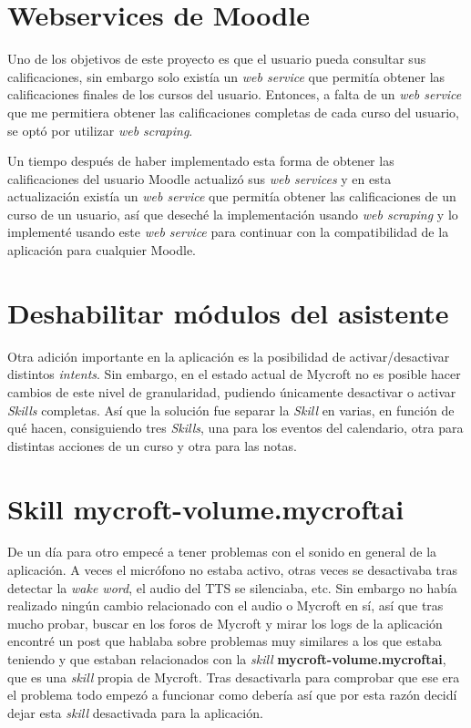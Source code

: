 \section{Webservices de Moodle}

Uno de los objetivos de este proyecto es que el usuario pueda consultar sus calificaciones, sin embargo solo existía un \textit{web service} que permitía obtener las calificaciones finales de los cursos del usuario. Entonces, a falta de un \textit{web service} que me permitiera obtener las calificaciones completas de cada curso del usuario, se optó por utilizar \textit{web scraping}.

Un tiempo después de haber implementado esta forma de obtener las calificaciones del usuario Moodle actualizó sus \textit{web services} y en esta actualización existía un \textit{web service} que permitía obtener las calificaciones de un curso de un usuario, así que deseché la implementación usando \textit{web scraping} y lo implementé usando este \textit{web service} para continuar con la compatibilidad de la aplicación para cualquier Moodle.

\section{Deshabilitar módulos del asistente}

Otra adición importante en la aplicación es la posibilidad de activar/desactivar distintos \textit{intents}. Sin embargo, en el estado actual de Mycroft no es posible hacer cambios de este nivel de granularidad, pudiendo únicamente desactivar o activar \textit{Skills} completas. Así que la solución fue separar la \textit{Skill} en varias, en función de qué hacen, consiguiendo tres \textit{Skills}, una para los eventos del calendario, otra para distintas acciones de un curso y otra para las notas.

\section{Skill mycroft-volume.mycroftai}

De un día para otro empecé a tener problemas con el sonido en general de la aplicación. A veces el micrófono no estaba activo, otras veces se desactivaba tras detectar la \textit{wake word}, el audio del TTS se silenciaba, etc. Sin embargo no había realizado ningún cambio relacionado con el audio o Mycroft en sí, así que tras mucho probar, buscar en los foros de Mycroft y mirar los logs de la aplicación encontré un post que hablaba sobre problemas muy similares a los que estaba teniendo y que estaban relacionados con la \textit{skill} \textbf{mycroft-volume.mycroftai}, que es una \textit{skill} propia de Mycroft. Tras desactivarla para comprobar que ese era el problema todo empezó a funcionar como debería así que por esta razón decidí dejar esta \textit{skill} desactivada para la aplicación.